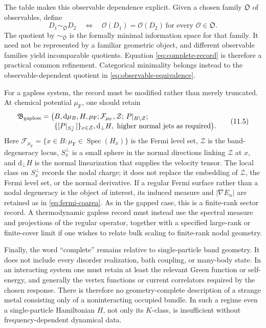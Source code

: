 \documentclass[11pt]{article}
\theoremstyle{definition}
\theoremstyle{remark}
\newcommand{\spec}{\operatorname{Spec}}
\newcommand{\dd}{\mathrm d}
\begin{document}
The table makes this observable dependence explicit.  Given a chosen family
\(\mathfrak O\) of observables, define
\[
 D_1\sim_{\mathfrak O}D_2
   \quad\Longleftrightarrow\quad
 \mathcal O(D_1)=\mathcal O(D_2)
 \ \text{for every }\mathcal O\in\mathfrak O .
 \tag{11.4}\label{eq:observable-equivalence}
\]
The quotient by \(\sim_{\mathfrak O}\) is the formally minimal information
space for that family.  It need not be represented by a familiar geometric
object, and different observable families yield incomparable quotients.
Equation \eqref{eq:complete-record} is therefore a practical common
refinement.  Categorical minimality belongs instead to the
observable-dependent quotient in \eqref{eq:observable-equivalence}.

For a gapless system, the record must be modified rather than merely
truncated.  At chemical potential \(\mu_{\mathrm F}\), one should retain
\[
\begin{aligned}
\mathfrak B_{\mathrm{gapless}}
=\bigl(&B,\dd\mu_B,H,\mu_{\mathrm F};
   \mathcal F_{\mu_{\mathrm F}},\mathcal Z;\,
   P|_{B\setminus\mathcal Z};\notag\\[-1mm]
 &\{[P|_{S_x^\perp}]\}_{x\in\mathcal Z},
   \dd_\perp H,\text{ higher normal jets as required}\bigr).
\end{aligned}
\tag{11.5}\label{eq:gapless-record}
\]
Here
\(\mathcal F_{\mu_{\mathrm F}}
  =\{x\in B:\mu_{\mathrm F}\in\spec(H_x)\}\)
is the Fermi level set, \(\mathcal Z\) is the band-degeneracy locus,
\(S_x^\perp\) is a small sphere in the normal directions linking
\(\mathcal Z\) at \(x\), and \(\dd_\perp H\) is the normal linearization
that supplies the velocity tensor.  The local class on \(S_x^\perp\)
records the nodal charge; it does not replace the embedding of
\(\mathcal Z\), the Fermi level set, or the normal derivative.  If a regular
Fermi surface rather than a nodal degeneracy is the object of interest, its
induced measure and \(|\nabla E_n|\) are retained as in
\eqref{eq:fermi-coarea}.  As in the gapped case, this is a finite-rank sector
record.  A thermodynamic gapless record must instead use the spectral measure
and projections of the regular operator, together with a specified large-rank
or finite-cover limit if one wishes to relate bulk scaling to finite-rank
nodal geometry.

Finally, the word ``complete'' remains relative to single-particle band
geometry.  It does not include every disorder realization, bath coupling, or
many-body state.  In an interacting system one must retain at least the
relevant Green function or self-energy, and generally the vertex functions
or current correlators required by the chosen response.  There is therefore
no geometry-complete description of a strange metal consisting only of a
noninteracting occupied bundle.  In such a regime even a single-particle
Hamiltonian \(H\), not only its \(K\)-class, is insufficient without
frequency-dependent dynamical data.
\end{document}

